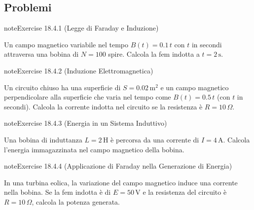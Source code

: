 \documentclass[letterpaper,10pt,italian]{jupyterBook}
\begin{document}
\sphinxstepscope


\subsection{Problemi}
\label{\detokenize{ch/electromagnetism/electromagnetism-general-problems:problemi}}\label{\detokenize{ch/electromagnetism/electromagnetism-general-problems:physics-hs-electromagnetism-electromagnetism-general-problems}}\label{\detokenize{ch/electromagnetism/electromagnetism-general-problems::doc}} \label{exercise:ch/electromagnetism/electromagnetism-general-problems-exercise-0}

\begin{sphinxadmonition}{note}{Exercise 18.4.1 (Legge di Faraday e Induzione)}



\sphinxAtStartPar
Un campo magnetico variabile nel tempo \(B(t) = 0.1 \, t\) con \(t\) in secondi attraversa una bobina di \(N = 100\) spire. Calcola la fem indotta a \(t = 2 \, \text{s}\).
\end{sphinxadmonition}
 \label{exercise:ch/electromagnetism/electromagnetism-general-problems-exercise-1}

\begin{sphinxadmonition}{note}{Exercise 18.4.2 (Induzione Elettromagnetica)}



\sphinxAtStartPar
Un circuito chiuso ha una superficie di \(S = 0.02 \, \text{m}^2\) e un campo magnetico perpendicolare alla superficie che varia nel tempo come \(B(t) = 0.5 \, t\) (con \(t\) in secondi). Calcola la corrente indotta nel circuito se la resistenza è \(R = 10 \, \Omega\).
\end{sphinxadmonition}
 \label{exercise:ch/electromagnetism/electromagnetism-general-problems-exercise-2}

\begin{sphinxadmonition}{note}{Exercise 18.4.3 (Energia in un Sistema Induttivo)}



\sphinxAtStartPar
Una bobina di induttanza \(L = 2 \, \text{H}\) è percorsa da una corrente di \(I = 4 \, \text{A}\). Calcola l’energia immagazzinata nel campo magnetico della bobina.
\end{sphinxadmonition}
 \label{exercise:ch/electromagnetism/electromagnetism-general-problems-exercise-3}

\begin{sphinxadmonition}{note}{Exercise 18.4.4 (Applicazione di Faraday nella Generazione di Energia)}



\sphinxAtStartPar
In una turbina eolica, la variazione del campo magnetico induce una corrente nella bobina. Se la fem indotta è di \(E = 50 \, \text{V}\) e la resistenza del circuito è \(R = 10 \, \Omega\), calcola la potenza generata.
\end{sphinxadmonition}
 \label{exercise:ch/electromagnetism/electromagnetism-general-problems-exercise-4}
\end{document}

